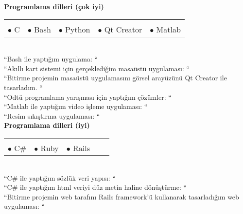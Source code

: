 \documentclass[10pt,a4paper]{article}
\begin{document}
{\bf Programlama dilleri (çok iyi)}\\
\hspace*{0.3in}\begin{tabular}{lrrrr}
\vspace{0.5 mm}\\
  $\bullet$ C &$\bullet$ Bash &$\bullet$ Python &$\bullet$ Qt Creator &$\bullet$ Matlab\\
\end{tabular}
\vspace{0.5 mm}\\
\hspace*{0.6in}\footnotesize{``Bash ile yaptığım uygulama: ``}\\
\hspace*{0.6in}\footnotesize{``Akıllı kart sistemi için gerçeklediğim masaüstü uygulaması: ``}\\
\hspace*{0.6in}\footnotesize{``Bitirme projemin masaüstü uygulamasını görsel arayüzünü Qt Creator ile tasarladım. ``}\\
\hspace*{0.6in}\footnotesize{``Odtü programlama yarışması için yaptığım çözümler: ``}\\
\hspace*{0.6in}\footnotesize{``Matlab ile yaptığım video işleme uygulaması: ``}\\
\hspace*{0.6in}\footnotesize{``Resim sıkıştırma uygulaması: ``}\\

{\bf Programlama dilleri (iyi)}\\
\hspace*{0.3in}\begin{tabular}{lrrrr}
\vspace{0.5 mm}\\
  $\bullet$ C$ \# $ &$\bullet$ Ruby &$\bullet$ Rails & &\\
\end{tabular}
\vspace{0.5 mm}\\
\hspace*{0.6in}\footnotesize{``C$ \# $ ile yaptığım sözlük veri yapısı: ``}\\
\hspace*{0.6in}\footnotesize{``C$ \# $ ile yaptığım html veriyi düz metin haline dönüştürme: ``}\\
\hspace*{0.6in}\footnotesize{``Bitirme projemin web tarafını Rails framework'ü kullanarak tasarladığım web uygulaması: ``}\\
\end{document}
